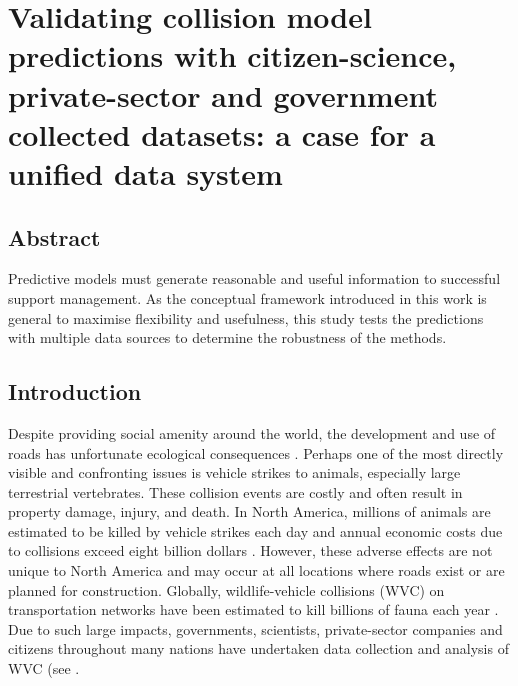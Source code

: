 \chapter{Validating collision model predictions with citizen-science, private-sector and government collected datasets: a case for a unified data system}\label{sec:val}
\newpage

\begin{localsize}{10}
\section*{\centering Abstract}

Predictive models must generate reasonable and useful information to successful support management.  As the conceptual framework introduced in this work is general to maximise flexibility and usefulness, this study tests the predictions with multiple data sources to determine the robustness of the methods.

\end{localsize}

\newpage
\section{Introduction}

Despite providing social amenity around the world, the development and use of roads has unfortunate ecological consequences \citep{form03}. Perhaps one of the most directly visible and confronting issues is vehicle strikes to animals, especially large terrestrial vertebrates. These collision events are costly and often result in property damage, injury, and death. In North America, millions of animals are estimated to be killed by vehicle strikes each day \citep{form98} and annual economic costs due to collisions exceed eight billion dollars \citep{huij07}. However, these adverse effects are not unique to North America and may occur at all locations where roads exist or are planned for construction.  Globally, wildlife-vehicle collisions (WVC) on transportation networks have been estimated to kill billions of fauna each year \citep{seil06}. Due to such large impacts, governments, scientists, private-sector companies and citizens throughout many nations have undertaken data collection and analysis of WVC (see \cite{rvdr15}.

